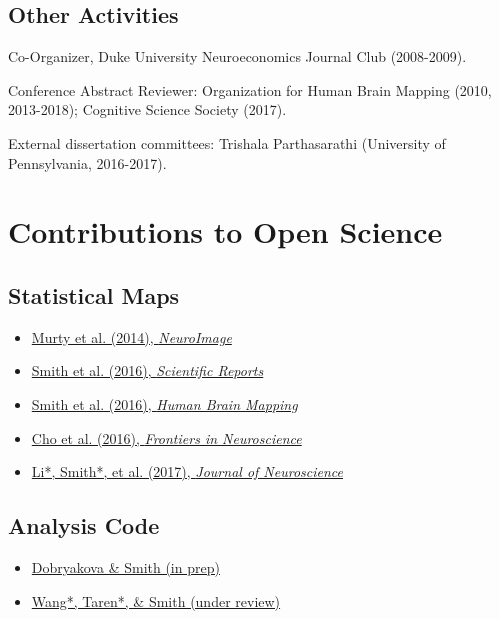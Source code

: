 \documentclass[11pt, letterpaper]{article}
\begin{document}
\subsection*{Other Activities}
\begin{hangparas}{.5in}{1}
Co-Organizer, Duke University Neuroeconomics Journal Club (2008-2009).

Conference Abstract Reviewer: Organization for Human Brain Mapping (2010, 2013-2018); Cognitive Science Society (2017).

External dissertation committees: Trishala Parthasarathi (University of Pennsylvania, 2016-2017). \\

\end{hangparas}


\vspace{.2cm}
\section*{Contributions to Open Science}
\subsection*{Statistical Maps}
\begin{itemize}[noitemsep]
\item \href{http://neurovault.org/collections/2485/}{Murty et al. (2014), \textit{NeuroImage}}
\item \href{http://neurovault.org/collections/1408/}{Smith et al. (2016), \textit{Scientific Reports}}
\item \href{http://neurovault.org/collections/1406/}{Smith et al. (2016), \textit{Human Brain Mapping}}
\item \href{http://neurovault.org/collections/2132/}{Cho et al. (2016), \textit{Frontiers in Neuroscience}}
\item \href{http://neurovault.org/collections/1484/}{Li*, Smith*, et al. (2017), \textit{Journal of Neuroscience}}
\end{itemize}

\subsection*{Analysis Code}
\begin{itemize}[noitemsep]
\item \faGithub \hspace{.2cm} \href{https://github.com/edobryakova/DobryakovaSmith_HCP}{Dobryakova \& Smith (in prep)}
\item \faGithub \hspace{.2cm} \href{https://github.com/DVS-Lab/dmn-parcellation}{Wang*, Taren*, \& Smith (under review)} \\
\end{itemize}
\end{document}
